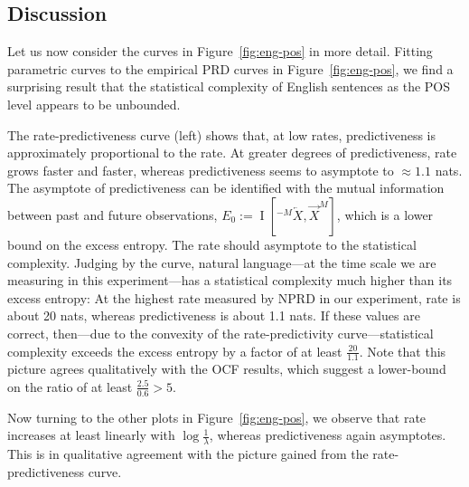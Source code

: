 \documentclass[entropy,article,submit,moreauthors,pdftex,10pt,a4paper]{Definitions/mdpi}
\newif \ifcomment
\newcommand\rljf[1]{\ifcomment{{\color{blue}(#1)}}\else{}\fi}
\newcommand{\finitefuture}{\overrightarrow{X}^{M}}
\newcommand{\finitepast}{^{-M}\overleftarrow{X}}%
\begin{document}
\subsection{Discussion}
Let us now consider the curves in Figure~\ref{fig:eng-pos} in more detail.
Fitting parametric curves to the empirical PRD curves in Figure~\ref{fig:eng-pos}, we find a surprising result that the statistical complexity of English sentences as the POS level appears to be unbounded.

The rate-predictiveness curve (left) shows that, at low rates, predictiveness is approximately proportional to the rate.
At greater degrees of predictiveness, rate grows faster and faster, whereas predictiveness seems to asymptote to $\approx 1.1$ nats.
The asymptote of predictiveness can be identified with the mutual information between past and future observations, $E_0 := \operatorname{I}[\finitepast, \finitefuture]$, which is a lower bound on the excess entropy. The rate should asymptote to the statistical complexity.
Judging by the curve, natural language---at the time scale we are measuring in this experiment---has a statistical complexity much higher than its excess entropy:
At the highest rate measured by NPRD in our experiment, rate is about 20 nats, whereas predictiveness is about 1.1 nats.
If these values are correct, then---due to the convexity of the rate-predictivity curve---statistical complexity exceeds the excess entropy by a factor of at least $\frac{20}{1.1}$. %
Note that this picture agrees qualitatively with the OCF results, which suggest a lower-bound on the ratio of at least $\frac{2.5}{0.6} > 5$.

Now turning to the other plots in Figure~\ref{fig:eng-pos}, we observe that rate increases at least linearly with $\log\frac{1}{\lambda}$, whereas predictiveness again asymptotes.
This is in qualitative agreement with the picture gained from the rate-predictiveness curve.
\end{document}
